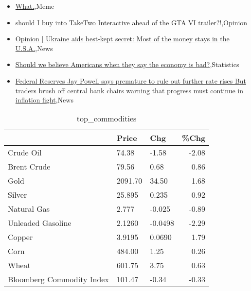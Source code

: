 \documentclass{article}%
\begin{document}
%
\begin{itemize}%
\item%
\href{https://reddit.com/r/wallstreetbets/comments/188ybcd/what/}{What.},Meme%
\item%
\href{https://reddit.com/r/StockMarket/comments/188jrm6/should\_i\_buy\_into\_taketwo\_interactive\_ahead\_of/}{should I buy into TakeTwo Interactive ahead of the GTA VI trailer?!},Opinion%
\item%
\href{https://reddit.com/r/Economics/comments/188scu2/opinion\_ukraine\_aids\_bestkept\_secret\_most\_of\_the/}{Opinion | Ukraine aids best-kept secret: Most of the money stays in the U.S.A.},News%
\item%
\href{https://reddit.com/r/Economics/comments/188q2ud/should\_we\_believe\_americans\_when\_they\_say\_the/}{Should we believe Americans when they say the economy is bad?},Statistics%
\item%
\href{https://reddit.com/r/Economics/comments/188j1t6/federal\_reserves\_jay\_powell\_says\_premature\_to/}{Federal Reserves Jay Powell says premature to rule out further rate rises  But traders brush off central bank chairs warning that progress must continue in inflation fight},News%
\end{itemize}%


\begin{table}[htbp]%
\caption{top\_commodities}%
\centering%
\begin{adjustbox}{width=1\textwidth}%
\begin{tabular}{lllr}
\toprule
                          &   Price &     Chg &  \%Chg \\
\midrule
               Crude Oil  &   74.38 &   -1.58 & -2.08 \\
             Brent Crude  &   79.56 &    0.68 &  0.86 \\
                    Gold  & 2091.70 &   34.50 &  1.68 \\
                  Silver  &  25.895 &   0.235 &  0.92 \\
             Natural Gas  &   2.777 &  -0.025 & -0.89 \\
       Unleaded Gasoline  &  2.1260 & -0.0498 & -2.29 \\
                  Copper  &  3.9195 &  0.0690 &  1.79 \\
                    Corn  &  484.00 &    1.25 &  0.26 \\
                   Wheat  &  601.75 &    3.75 &  0.63 \\
Bloomberg Commodity Index &  101.47 &   -0.34 & -0.33 \\
\bottomrule
\end{tabular}
%
\end{adjustbox}%
\end{table}
\end{document}
